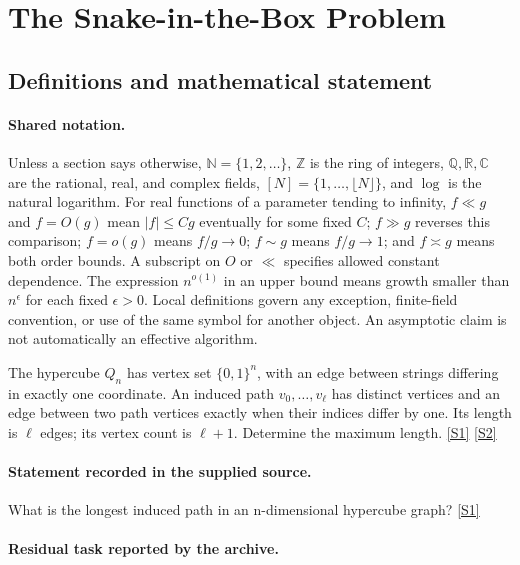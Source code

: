 \documentclass[11pt,a4paper]{article}
\newcommand{\N}{\mathbb{N}}
\newcommand{\Z}{\mathbb{Z}}
\newcommand{\Q}{\mathbb{Q}}
\newcommand{\R}{\mathbb{R}}
\newcommand{\C}{\mathbb{C}}
\newcommand{\sref}[2]{\hyperlink{source:#1:#2}{[S#2]}}
\begin{document}
\section{The Snake-in-the-Box Problem}\label{statement}


\subsection{Definitions and mathematical statement}

\paragraph{Shared notation.}Unless a section says otherwise, $\N=\{1,2,\ldots\}$,
$\Z$ is the ring of integers, $\Q,\R,\C$ are the rational, real, and complex
fields, $[N]=\{1,\ldots,\lfloor N\rfloor\}$, and $\log$ is the natural
logarithm. For real functions of a parameter tending to infinity,
$f\ll g$ and $f=O(g)$ mean $|f|\leq Cg$ eventually for some fixed $C$;
$f\gg g$ reverses this comparison; $f=o(g)$ means $f/g\to0$;
$f\sim g$ means $f/g\to1$; and $f\asymp g$ means both order bounds.
A subscript on $O$ or $\ll$ specifies allowed constant dependence.
The expression $n^{o(1)}$ in an upper bound means growth smaller than
$n^\epsilon$ for each fixed $\epsilon>0$. Local definitions govern any
exception, finite-field convention, or use of the same symbol for another
object. An asymptotic claim is not automatically an effective algorithm.



The hypercube $Q_n$ has vertex set $\{0,1\}^n$, with an edge between strings differing in exactly one coordinate. An induced path $v_0,\ldots,v_\ell$ has distinct vertices and an edge between two path vertices exactly when their indices differ by one. Its length is $\ell$ edges; its vertex count is $\ell+1$. Determine the maximum length. \sref{statement}{1} \sref{statement}{2}

\paragraph{Statement recorded in the supplied source.}
What is the longest induced path in an n-dimensional hypercube graph? \sref{statement}{1}

\paragraph{Residual task reported by the archive.}
\end{document}
